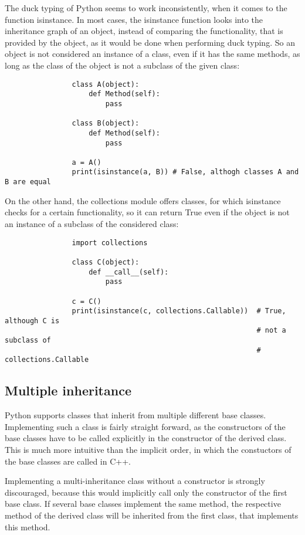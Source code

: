 			The duck typing of Python seems to work inconsistently, when it comes to the function {\normalfont \ttfamily isinstance}.
			In most cases, the {\normalfont \ttfamily isinstance} function looks into the inheritance graph of an object, instead of comparing the functionality, that is provided by the object, as it would be done when performing duck typing.
			So an object is not considered an instance of a class, even if it has the same methods, as long as the class of the object is not a subclass of the given class:
			\begin{verbatim}
				class A(object):
					def Method(self):
						pass

				class B(object):
					def Method(self):
						pass

				a = A()
				print(isinstance(a, B))	# False, althogh classes A and B are equal
			\end{verbatim}
			On the other hand, the {\normalfont \ttfamily collections} module offers classes, for which {\normalfont \ttfamily isinstance} checks for a certain functionality, so it can return {\normalfont \ttfamily True} even if the object is not an instance of a subclass of the considered class:
			\begin{verbatim}
				import collections

				class C(object):
					def __call__(self):
						pass

				c = C()
				print(isinstance(c, collections.Callable))  # True, although C is
				                                            # not a subclass of
				                                            # collections.Callable
			\end{verbatim}

		\subsection{Multiple inheritance}
			Python supports classes that inherit from multiple different base classes.
			Implementing such a class is fairly straight forward, as the constructors of the base classes have to be called explicitly in the constructor of the derived class.
			This is much more intuitive than the implicit order, in which the constuctors of the base classes are called in C++.

			Implementing a multi-inheritance class without a constructor is strongly discouraged, because this would implicitly call only the constructor of the first base class.
			If several base classes implement the same method, the respective method of the derived class will be inherited from the first class, that implements this method.

